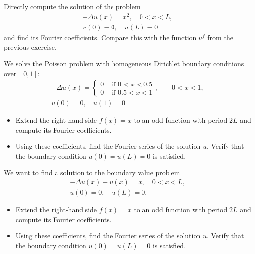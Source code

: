 \documentclass[11pt]{article}
\begin{document}
\begin{exercise}[Extra]
    Directly compute the solution of the problem
    \begin{gather*}
        - \Delta u(x) = x^2, \quad 0 < x < L,
        \\
        u(0) = 0, \quad u(L) = 0
    \end{gather*}
    and find its Fourier coefficients. Compare this with the function $u^f$ from the previous exercise.
\end{exercise}
\begin{solution}     
\end{solution}

\begin{exercise}
    We solve the Poisson problem with homogeneous Dirichlet boundary conditions over $[0,1]$:
    \begin{gather*}
        - \Delta u(x) = \left\{\begin{array}{ll} 0 & \text{ if } 0 < x < 0.5 \\ 0 & \text{ if } 0.5 < x < 1 \end{array}\right., \qquad 0 < x < 1,
        \\
        u(0) = 0, \quad u(1) = 0
    \end{gather*}
    \begin{itemize}
        \item Extend the right-hand side $f(x) = x$ to an odd function with period $2L$ and compute its Fourier coefficients.
        \item Using these coefficients, find the Fourier series of the solution $u$. Verify that the boundary condition $u(0) = u(L) = 0$ is satisfied.
    \end{itemize}
\end{exercise}
\begin{solution}     
\end{solution}

\begin{exercise}
    We want to find a solution to the boundary value problem 
    \begin{gather*}
        - \Delta u(x) + u(x) = x, \quad 0 < x < L,
        \\
        u(0) = 0, \quad u(L) = 0.
    \end{gather*}
    \begin{itemize}
        \item Extend the right-hand side $f(x) = x$ to an odd function with period $2L$ and compute its Fourier coefficients.
        \item Using these coefficients, find the Fourier series of the solution $u$. Verify that the boundary condition $u(0) = u(L) = 0$ is satisfied.
    \end{itemize}
\end{exercise}
\begin{solution}     
\end{solution}
\end{document}
